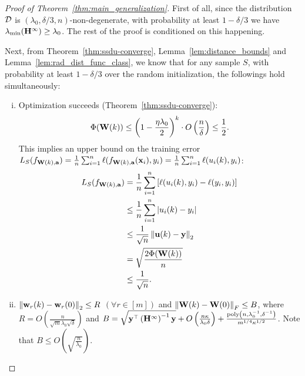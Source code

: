 \begin{proof}[Proof of Theorem~\ref{thm:main_generalization}]
	First of all, since the distribution $\mathcal{D}$ is $(\lambda_0, \delta/3, n)$-non-degenerate, with probability at least $1-\delta/3$ we have $\lambda_{\min}(\mathbf{H}^\infty) \ge \lambda_0$. The rest of the proof is conditioned on this happening.
	
	 Next, from Theorem~\ref{thm:ssdu-converge}, Lemma~\ref{lem:distance_bounds} and Lemma~\ref{lem:rad_dist_func_class}, we know that for any sample $S$, with probability at least $1-\delta/3$ over the random initialization, the followings hold simultaneously:
	 \begin{enumerate}[(i)]
	 	\item Optimization succeeds (Theorem~\ref{thm:ssdu-converge}):
	 	\begin{equation*} 
	 	\Phi(\mat W(k)) \le \left( 1-\frac{\eta\lambda_0}{2} \right)^k \cdot O\left( \frac{n}{\delta} \right) \le \frac12. %
	 	\end{equation*}
	 	This implies an upper bound on the training error $L_S(f_{\mathbf{W}(k), \mathbf{a}}) = \frac1n \sum_{i=1}^n \ell(f_{\mathbf{W}(k), \mathbf{a}}(\mathbf{x}_i), y_i) = \frac1n \sum_{i=1}^n \ell(u_i(k), y_i)$:
	 	\begin{align*}
	 	L_S(f_{\mat W(k), \vect a}) &= \frac1n \sum_{i=1}^n \left[ \ell(u_i(k), y_i) - \ell(y_i, y_i)\right] \\
	 	&\le \frac1n \sum_{i=1}^n \abs{u_i(k) - y_i} \\
	 	&\le \frac{1}{\sqrt n} \norm{\vect u(k) - \vect y}_2 \\
	 	&= \sqrt{\frac{2\Phi(\mat W(k))}{n}} \\
	 	&\le \frac{1}{\sqrt n}. %
	 	\end{align*}
	 	
	 	\item $\left\|\mathbf{w}_r(k) - \mathbf{w}_r(0)\right\|_2 \le R$ $(\forall r\in[m])$ and
	 	 $\left\|\mathbf{W}(k)-\mathbf{W}(0)\right\|_{F} \le B $,
	 	where $R = O\left( \frac{ n }{\sqrt m \lambda_0\sqrt{\delta}} \right)$   and $B = \sqrt{\mathbf{y}^\top \left(\mathbf{H}^{\infty}\right)^{-1}\mathbf{y}} + O\left( \frac{  n \kappa}{\lambda_0 \delta} \right) + \frac{\mathrm{poly}\left(n, \lambda_0^{-1}, \delta^{-1} \right)}{m^{1/4} \kappa^{1/2}}$.
	 	Note that $B\le O\left( \sqrt{\frac{n}{\lambda_0}} \right)$.
	 	

\end{enumerate}
\end{proof}
